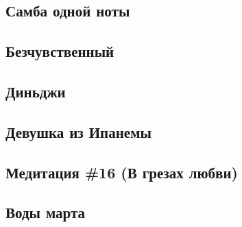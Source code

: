 \documentclass[
]{article}
\begin{document}
\hypertarget{ux441ux430ux43cux431ux430-ux43eux434ux43dux43eux439-ux43dux43eux442ux44b}{%
\subsection*{Самба одной ноты}\label{ux441ux430ux43cux431ux430-ux43eux434ux43dux43eux439-ux43dux43eux442ux44b}}

\hypertarget{ux431ux435ux437ux447ux443ux432ux441ux442ux432ux435ux43dux43dux44bux439}{%
\subsection*{Безчувственный}\label{ux431ux435ux437ux447ux443ux432ux441ux442ux432ux435ux43dux43dux44bux439}}

\hypertarget{ux434ux438ux43dux44cux434ux436ux438}{%
\subsection*{Диньджи}\label{ux434ux438ux43dux44cux434ux436ux438}}

\hypertarget{ux434ux435ux432ux443ux448ux43aux430-ux438ux437-ux438ux43fux430ux43dux435ux43cux44b}{%
\subsection*{Девушка из Ипанемы}\label{ux434ux435ux432ux443ux448ux43aux430-ux438ux437-ux438ux43fux430ux43dux435ux43cux44b}}

\hypertarget{ux43cux435ux434ux438ux442ux430ux446ux438ux44f-16-ux432-ux433ux440ux435ux437ux430ux445-ux43bux44eux431ux432ux438}{%
\subsection*{Медитация \#16 (В грезах любви)}\label{ux43cux435ux434ux438ux442ux430ux446ux438ux44f-16-ux432-ux433ux440ux435ux437ux430ux445-ux43bux44eux431ux432ux438}}

\hypertarget{ux432ux43eux434ux44b-ux43cux430ux440ux442ux430}{%
\subsection*{Воды марта}\label{ux432ux43eux434ux44b-ux43cux430ux440ux442ux430}}
\end{document}
